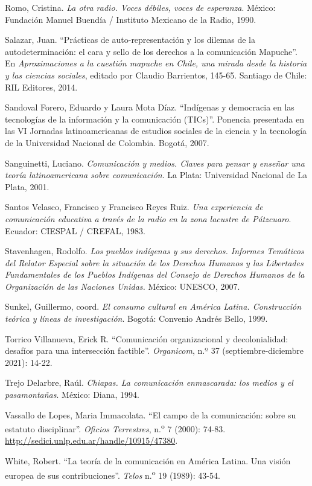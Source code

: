 \documentclass{tufte-handout}
\begin{document}
\begin{hangparas}{.25in}{1}
Romo, Cristina. \emph{La otra radio. Voces débiles, voces de esperanza}.
México: Fundación Manuel Buendía / Instituto Mexicano de la Radio, 1990.

Salazar, Juan. ``Prácticas de auto-representación y los dilemas de la
autodeterminación: el cara y sello de los derechos a la comunicación
Mapuche''. En \emph{Aproximaciones a la cuestión mapuche en Chile, una
mirada desde la historia y las ciencias sociales}, editado por Claudio
Barrientos, 145-65. Santiago de Chile: RIL Editores, 2014.

Sandoval Forero, Eduardo y Laura Mota Díaz. ``Indígenas y democracia en
las tecnologías de la información y la comunicación (TICs)''. Ponencia
presentada en las VI Jornadas latinoamericanas de estudios sociales de
la ciencia y la tecnología de la Universidad Nacional de Colombia.
Bogotá, 2007.

Sanguinetti, Luciano. \emph{Comunicación y medios. Claves para pensar y
enseñar una teoría latinoamericana sobre comunicación}. La Plata:
Universidad Nacional de La Plata, 2001.

Santos Velasco, Francisco y Francisco Reyes Ruiz. \emph{Una experiencia
de comunicación educativa a través de la radio en la zona lacustre de
Pátzcuaro}. Ecuador: CIESPAL / CREFAL, 1983.

Stavenhagen, Rodolfo. \emph{Los pueblos indígenas y sus derechos.
Informes Temáticos del Relator Especial sobre la situación de los
Derechos Humanos y las Libertades Fundamentales de los Pueblos Indígenas
del Consejo de Derechos Humanos de la Organización de las Naciones
Unidas.} México: UNESCO, 2007.

Sunkel, Guillermo, coord. \emph{El consumo cultural en América Latina.
Construcción teórica y líneas de investigación}. Bogotá: Convenio Andrés
Bello, 1999.

Torrico Villanueva, Erick R. ``Comunicación organizacional y
decolonialidad: desafíos para una intersección factible''.
\emph{Organicom}, n.º 37 (septiembre-diciembre 2021): 14-22.

Trejo Delarbre, Raúl. \emph{Chiapas. La comunicación enmascarada: los
medios y el pasamontañas}. México: Diana, 1994.

Vassallo de Lopes, Maria Immacolata. ``El campo de la comunicación:
sobre su estatuto disciplinar''. \emph{Oficios Terrestres},
n.\textsuperscript{o} 7 (2000): 74-83.
\url{http://sedici.unlp.edu.ar/handle/10915/47380}.

White, Robert. ``La teoría de la comunicación en América Latina. Una
visión europea de sus contribuciones''. \emph{Telos}
n.\textsuperscript{o} 19 (1989): 43-54.



\end{hangparas}
\end{document}
